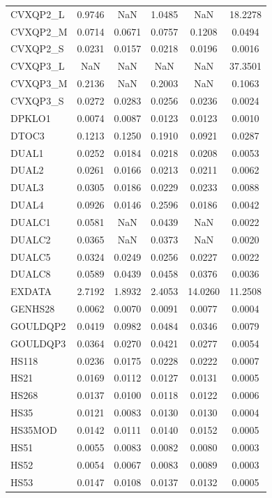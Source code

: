 \begin{longtable}{lccccc}
CVXQP2_L & 0.9746 & NaN & 1.0485 & NaN & 18.2278 \\
CVXQP2_M & 0.0714 & 0.0671 & 0.0757 & 0.1208 & 0.0494 \\
CVXQP2_S & 0.0231 & 0.0157 & 0.0218 & 0.0196 & 0.0016 \\
CVXQP3_L & NaN & NaN & NaN & NaN & 37.3501 \\
CVXQP3_M & 0.2136 & NaN & 0.2003 & NaN & 0.1063 \\
CVXQP3_S & 0.0272 & 0.0283 & 0.0256 & 0.0236 & 0.0024 \\
DPKLO1 & 0.0074 & 0.0087 & 0.0123 & 0.0123 & 0.0010 \\
DTOC3 & 0.1213 & 0.1250 & 0.1910 & 0.0921 & 0.0287 \\
DUAL1 & 0.0252 & 0.0184 & 0.0218 & 0.0208 & 0.0053 \\
DUAL2 & 0.0261 & 0.0166 & 0.0213 & 0.0211 & 0.0062 \\
DUAL3 & 0.0305 & 0.0186 & 0.0229 & 0.0233 & 0.0088 \\
DUAL4 & 0.0926 & 0.0146 & 0.2596 & 0.0186 & 0.0042 \\
DUALC1 & 0.0581 & NaN & 0.0439 & NaN & 0.0022 \\
DUALC2 & 0.0365 & NaN & 0.0373 & NaN & 0.0020 \\
DUALC5 & 0.0324 & 0.0249 & 0.0256 & 0.0227 & 0.0022 \\
DUALC8 & 0.0589 & 0.0439 & 0.0458 & 0.0376 & 0.0036 \\
EXDATA & 2.7192 & 1.8932 & 2.4053 & 14.0260 & 11.2508 \\
GENHS28 & 0.0062 & 0.0070 & 0.0091 & 0.0077 & 0.0004 \\
GOULDQP2 & 0.0419 & 0.0982 & 0.0484 & 0.0346 & 0.0079 \\
GOULDQP3 & 0.0364 & 0.0270 & 0.0421 & 0.0277 & 0.0054 \\
HS118 & 0.0236 & 0.0175 & 0.0228 & 0.0222 & 0.0007 \\
HS21 & 0.0169 & 0.0112 & 0.0127 & 0.0131 & 0.0005 \\
HS268 & 0.0137 & 0.0100 & 0.0118 & 0.0122 & 0.0006 \\
HS35 & 0.0121 & 0.0083 & 0.0130 & 0.0130 & 0.0004 \\
HS35MOD & 0.0142 & 0.0111 & 0.0140 & 0.0152 & 0.0005 \\
HS51 & 0.0055 & 0.0083 & 0.0082 & 0.0080 & 0.0003 \\
HS52 & 0.0054 & 0.0067 & 0.0083 & 0.0089 & 0.0003 \\
HS53 & 0.0147 & 0.0108 & 0.0137 & 0.0132 & 0.0005 \\

\end{longtable}
